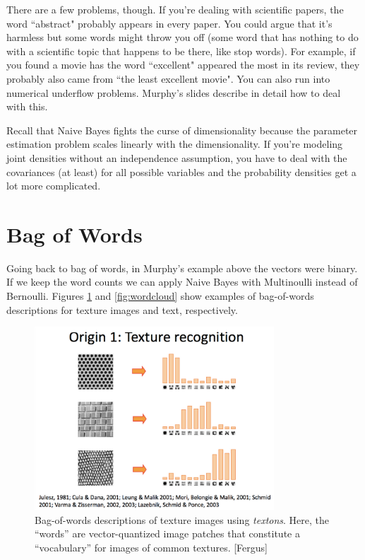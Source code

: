 \documentclass[a4paper]{article}
\begin{document}
There are a few problems, though.  If you're dealing with scientific papers, the word ``abstract" probably appears in every paper. You could argue that it's harmless but some words might throw you off (some word that has nothing to do with a scientific topic that happens to be there, like stop words). For example, if you found a movie has the word ``excellent" appeared the most in its review, they probably also came from ``the least excellent movie". You can also run into numerical underflow problems.  Murphy's slides describe in detail how to deal with this.

Recall that Naive Bayes fights the curse of dimensionality because the parameter estimation problem scales linearly with the dimensionality.  If you're modeling joint densities without an independence assumption, you have to deal with the covariances (at least) for all possible variables and the probability densities get a lot more complicated.

\section{Bag of Words}

Going back to bag of words, in Murphy's example above the vectors were binary.  If we keep the word counts we can apply Naive Bayes with Multinoulli instead of Bernoulli.  Figures \ref{fig:texture} and \ref{fig:wordcloud} show examples of bag-of-words descriptions for texture images and text, respectively.


\begin{figure}
\centering
\includegraphics[width=0.8\textwidth]{fig4b_fergus.png}
\caption{\label{fig:texture}Bag-of-words descriptions of texture images using \emph{textons}.  Here, the ``words'' are vector-quantized image patches that constitute a ``vocabulary'' for images of common textures. [Fergus]}
\end{figure}
\end{document}
